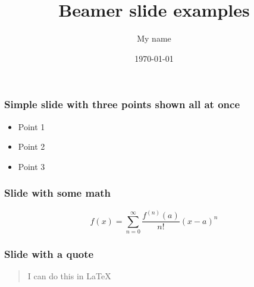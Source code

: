 \documentclass[]{beamer}
\title{Beamer slide examples}    %
\author{My name}                 %
\institute{My organization}      %
\date{\today}                    %
\begin{document}
\begin{frame}
  \titlepage
\end{frame}


\begin{frame}
  \frametitle{Simple slide with three points shown all at once}   %

  \begin{itemize}
  \item Point 1
  \item Point 2
  \item Point 3
  \end{itemize}
\end{frame}

\begin{frame}
  \frametitle{Slide with some math}   %
\begin{equation}
f(x)=\sum_{n=0}^\infty\frac{f^{(n)}(a)}{n!}(x-a)^n
\end{equation}
\end{frame}

\begin{frame}
  \frametitle{Slide with a quote}   %
\begin{quote}
I can do this in LaTeX
\end{quote}
\end{frame}
\end{document}

